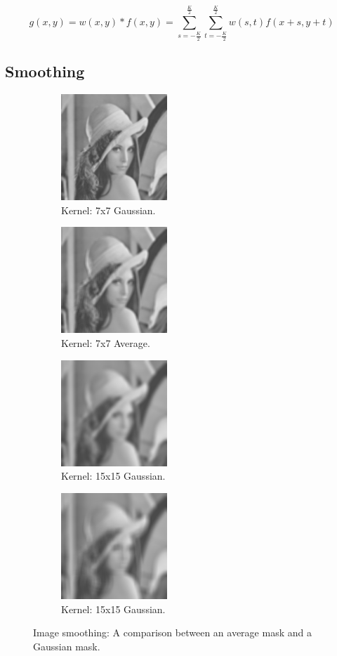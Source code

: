 \documentclass[letterpaper,10pt]{article}
\begin{document}
\begin{equation}
g(x,y)=w(x,y)*f(x,y)=\sum_{s=-\frac{K}{2}}^{\frac{K}{2}}\sum_{t=-\frac{K}{2}}^{\frac{K}{2}}w(s,t)f(x+s,y+t)
\label{eq:correlation}
\end{equation}
\subsection{Smoothing}
  \begin{figure}[hbtp]
    \centering
    \begin{subfigure}{4cm}
      \includegraphics[width=4cm]{images/smoothing_gaussian_7.png}
      \caption{Kernel: 7x7 Gaussian.}
    \end{subfigure}
    \begin{subfigure}{4cm}
      \includegraphics[width=4cm]{images/smoothing_average_7.png}
      \caption{Kernel: 7x7 Average.}
    \end{subfigure}
    \begin{subfigure}{4cm}
      \includegraphics[width=4cm]{images/smoothing_gaussian_15.png}
      \caption{Kernel: 15x15 Gaussian.}
    \end{subfigure}
    \begin{subfigure}{4cm}
      \includegraphics[width=4cm]{images/smoothing_average_15.png}
      \caption{Kernel: 15x15 Gaussian.}
    \end{subfigure}
    \caption{Image smoothing: A comparison between an average mask and a Gaussian mask.}
    \label{fig:smoothinglenna}
  \end{figure}
\end{document}
